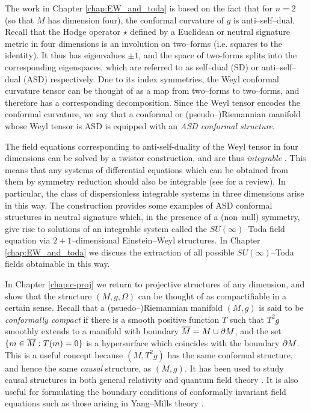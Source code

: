 The work in Chapter \ref{chap:EW_and_toda} is based on the fact that for $n=2$ (so that $M$ has dimension four), the conformal
curvature of $g$ is anti--self--dual. Recall that the Hodge operator
$\star$ defined by a Euclidean or neutral signature metric in four
dimensions is an involution on two--forms (i.e. squares to the identity).
It thus has eigenvalues $\pm1$, and the space of two-forms splits
into the corresponding eigenspaces, which are referred to as self--dual
(SD) or anti--self--dual (ASD) respectively. Due to its index symmetries,
the Weyl conformal curvature tensor can be thought of as a map from two--forms to two--forms,
and therefore has a corresponding decomposition. Since the Weyl tensor
encodes the conformal curvature, we say that a conformal or (pseudo--)Riemannian
manifold whose Weyl tensor is ASD is equipped with an \textit{ASD
conformal structure}.

The field equations corresponding to anti-self-duality of the Weyl
tensor in four dimensions can be solved by a twistor construction,
and are thus \textit{integrable} \cite{wardGauge}. This means that any systems of differential
equations which can be obtained from them by symmetry reduction should
also be integrable (see \cite{MW} for a review). In particular, the class of dispersionless
integrable systems in three dimensions arise in this way. The
construction \cite{DM} provides some examples of
ASD conformal structures in neutral signature which, in the presence
of a (non--null) symmetry, give rise to solutions of an integrable
system called the $SU(\infty)$--Toda field equation via $2+1$--dimensional
Einstein--Weyl structures. In Chapter \ref{chap:EW_and_toda} we discuss the extraction
of all possible $SU(\infty)$--Toda fields obtainable in this way.

In Chapter \ref{chap:c-proj} we return to projective structures of any dimension, and show that the structure $(M,g,\Omega)$ can be thought of as compactifiable in a certain sense. Recall that a (psuedo--)Riemannian manifold $(M,g)$ is said to be \textit{conformally compact} if there is a smooth positive function $T$ such that $T^2g$ smoothly extends to a manifold with boundary $\overline{M}=M\cup\partial M$, and the set $\{m\in\overline{M}:T(m)=0\}$ is a hypersurface which coincides with the boundary $\partial M$.  This is a useful concept because $(M,T^2g)$ has the same conformal structure, and hence the same \textit{causal} structure, as $(M,g)$. It has been used to study causal structures in both general relativity \cite{penrose65} and quantum field theory \cite{witten}. It is also useful for formulating the boundary conditions of conformally invariant field equations such as those arising in Yang--Mills theory \cite{uhlen}.


